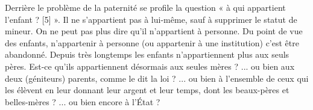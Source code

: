  Derrière le problème de la paternité se profile la question « à qui appartient l'enfant ?%
[5]%
 ». Il ne s'appartient pas à lui-même, sauf à supprimer le statut de mineur. On ne peut pas plus dire qu'il n'appartient à personne. Du point de vue des enfants, n'appartenir à personne (ou appartenir à une institution) c'est être abandonné. Depuis très longtemps les enfants n'appartiennent plus aux seuls pères. Est-ce qu'ils appartiennent désormais aux seules mères ? ... ou bien aux deux (géniteurs) parents, comme le dit la loi ? ... ou bien à l'ensemble de ceux qui les élèvent en leur donnant leur argent et leur temps, dont les beaux-pères et belles-mères ? ... ou bien encore à l'État ?


